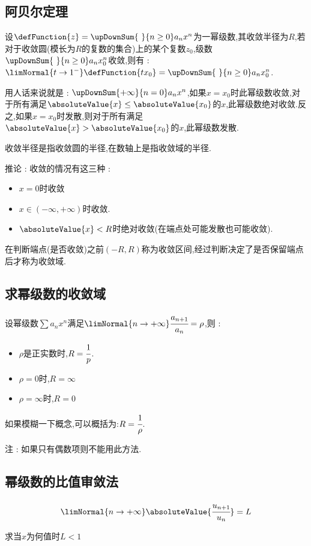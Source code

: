 {{{\subsection{阿贝尔定理}{
  设$\defFunction{z} = \upDownSum{\ }{n \geq 0}a_nx^n$为一幂级数,其收敛半径为$R$,若对于收敛圆(模长为$R$的复数的集合)上的某个复数$z_0$,级数$\upDownSum{\ }{n \geq 0}a_nx^n_0$收敛,则有 : $\limNormal{t \to 1^-}\defFunction{tx_0} = \upDownSum{\ }{n \geq 0}a_nx^n_0$.

  用人话来说就是 : $\upDownSum{+\infty}{n = 0}a_nx^n$,如果$x = x_0$时此幂级数收敛,对于所有满足$\absoluteValue{x} \leq \absoluteValue{x_0}$的$x$,此幂级数绝对收敛.反之,如果$x = x_0$时发散,则对于所有满足$\absoluteValue{x} > \absoluteValue{x_0}$的$x$,此幂级数发散.

  收敛半径是指收敛圆的半径,在数轴上是指收敛域的半径.

  推论 : 收敛的情况有这三种 :
  \begin{itemize}
    \item $x = 0$时收敛
    \item $x \in (-\infty,+\infty)$时收敛.
    \item $\absoluteValue{x} < R$时绝对收敛(在端点处可能发散也可能收敛).
  \end{itemize}
  在判断端点(是否收敛)之前$(-R,R)$称为收敛区间,经过判断决定了是否保留端点后才称为收敛域.
}

\subsection{求幂级数的收敛域}{
  设幂级数$\sum a_nx^n$满足$\limNormal{n \to +\infty}\cfrac{a_{n + 1}}{a_n} = \rho$,则 :
  \begin{itemize}
    \item $\rho$是正实数时,$R = \cfrac{1}{p}$.
    \item $\rho = 0$时,$R = \infty$
    \item $\rho = \infty$时,$R = 0$
  \end{itemize}

  如果模糊一下概念,可以概括为:$R = \cfrac{1}{\rho}$.

  注 : 如果只有偶数项则不能用此方法.
}%

\subsection{幂级数的比值审敛法}{
$$
  \limNormal{n \to +\infty}\absoluteValue{\cfrac{u_{n + 1}}{u_n}} = L
$$

求当$x$为何值时$L < 1$

}}}}
